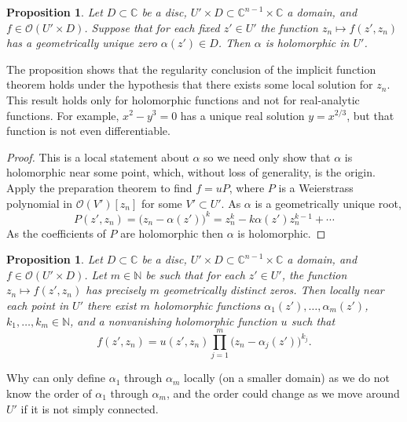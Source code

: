 \documentclass[12pt,openany]{book}
\newcommand{\C}{{\mathbb{C}}}
\newcommand{\N}{{\mathbb{N}}}
\newcommand{\sO}{{\mathscr{O}}}
\theoremstyle{plain}
\newtheorem{prop}[thm]{Proposition}
\theoremstyle{remark}
\theoremstyle{definition}
\theoremstyle{exercise}
\theoremstyle{example}
\begin{document}
\begin{prop} \label{prop:roothol}
Let $D \subset \C$ be a disc, 
$U' \times D \subset \C^{n-1} \times \C$ a domain,
and
$f \in \sO(U' \times D)$.
Suppose that for each fixed $z' \in U'$ the function
$z_n \mapsto f(z',z_n)$ has a geometrically unique zero $\alpha(z') \in D$.  Then $\alpha$ is
holomorphic in $U'$.
\end{prop}

The proposition shows that the regularity conclusion of the implicit
function theorem holds under the hypothesis that there exists some local
solution for $z_n$.  This result holds only for holomorphic
functions and not for real-analytic functions.  For example, $x^2-y^3 = 0$ has a
unique real solution $y = x^{2/3}$, but that function is not even
differentiable.

\begin{proof}
This is a local statement about $\alpha$ so we need only show
that $\alpha$ is holomorphic near some point, which, without loss
of generality, is the origin.
Apply the preparation
theorem to find $f = u P$,
where $P$ is a
Weierstrass polynomial in $\sO(V')[z_n]$ for some $V' \subset U'$.
As $\alpha$ is a geometrically unique root,
\begin{equation*}
P(z',z_n) = {\bigl(z_n-\alpha(z') \bigr)}^k = z_n^k - k \alpha(z') z_n^{k-1}
+ \cdots
\end{equation*}
As the coefficients of $P$ are holomorphic then $\alpha$ is holomorphic.
\end{proof}

\begin{prop} \label{prop:rootshol}
Let $D \subset \C$ be a disc, 
$U' \times D \subset \C^{n-1} \times \C$ a domain,
and
$f \in \sO(U' \times D)$.
Let $m \in \N$ be such that
for each $z' \in U'$, the function $z_n \mapsto f(z',z_n)$ has
precisely $m$ geometrically distinct zeros.
Then locally near each point in $U'$ there exist $m$ holomorphic functions
$\alpha_1(z'),\ldots,\alpha_m(z')$,
$k_1,\ldots,k_m \in \N$,
and a nonvanishing holomorphic function $u$
such that
\begin{equation*}
f(z',z_n) = u(z',z_n) \prod_{j=1}^m {\bigl( z_n - \alpha_j(z') \bigr)}^{k_j}
.
\end{equation*}
\end{prop}

Why can only define $\alpha_1$ through $\alpha_m$ locally (on a
smaller domain) as we do not know
the order of $\alpha_1$ through $\alpha_m$, and the order could change 
as we move around 
$U'$ if it is not simply connected.
\end{document}
